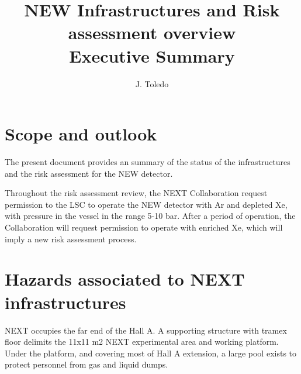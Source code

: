 \documentclass[11pt]{article}
\begin{document}
    \raggedbottom
    \sloppy {}
    \setlength{\parskip}{3ex}

\title{NEW Infrastructures and Risk assessment overview \\Executive Summary}

\author{J. Toledo}


\maketitle

\section{Scope and outlook}

The present document provides an summary of the status of the infrastructures and the risk assessment for the NEW detector.

Throughout the risk assessment review, the NEXT Collaboration request permission to the LSC to operate the NEW detector with Ar and depleted Xe, 
with pressure in the vessel in the range 5-10 bar. After a period of operation, the Collaboration will  request permission to operate with enriched Xe, which will imply a new risk assessment process.
 

\section{Hazards associated to NEXT infrastructures}
NEXT occupies the far end of the Hall A. A supporting structure with tramex floor delimits the 11x11 m2 NEXT experimental area and working platform. 
Under the platform, and covering most of Hall A extension, a large pool exists to protect personnel from gas and liquid dumps.
\end{document}

